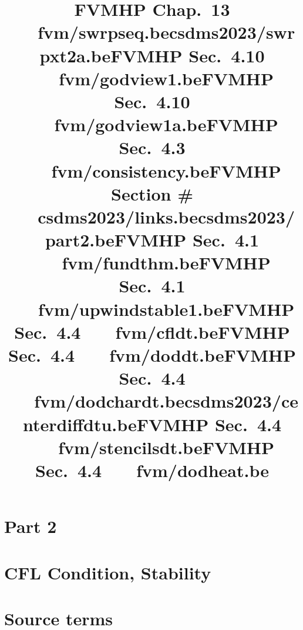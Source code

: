 \documentclass{beamer}
\newcommand{\mkslide}[1]{\title{CSDMS Tutorial on FV Methods, May 2023}
   }
\newcommand{\mkslidelabel}[2]{\title{#2}}
\renewcommand{\mkslide}[1]{\title{#1}}
\renewcommand{\mkslidelabel}[2]{\title{#2 ~~~#1}}
\begin{document}
\mkslidelabel{fvm/swrpseq.be}{FVMHP Chap.\ 13}
\mkslide{csdms2023/swrpxt2a.be}

\mkslidelabel{fvm/godview1.be}{FVMHP Sec.\ 4.10}
\mkslidelabel{fvm/godview1a.be}{FVMHP Sec.\ 4.10}



\mkslidelabel{fvm/consistency.be}{FVMHP Sec.\ 4.3}

\mkslidelabel{csdms2023/links.be}{FVMHP Section \#}


\section{Part 2}
\mkslide{csdms2023/part2.be}

\section{CFL Condition, Stability}
\mkslidelabel{fvm/fundthm.be}{FVMHP Sec.\ 4.1}
\mkslidelabel{fvm/upwindstable1.be}{FVMHP Sec.\ 4.1}
\mkslidelabel{fvm/cfldt.be}{FVMHP Sec.\ 4.4}
\mkslidelabel{fvm/doddt.be}{FVMHP Sec.\ 4.4}
\mkslidelabel{fvm/dodchardt.be}{FVMHP Sec.\ 4.4}
\mkslide{csdms2023/centerdiffdtu.be}
\mkslidelabel{fvm/stencilsdt.be}{FVMHP Sec.\ 4.4}
\mkslidelabel{fvm/dodheat.be}{FVMHP Sec.\ 4.4}


\section{Source terms}
\end{document}
